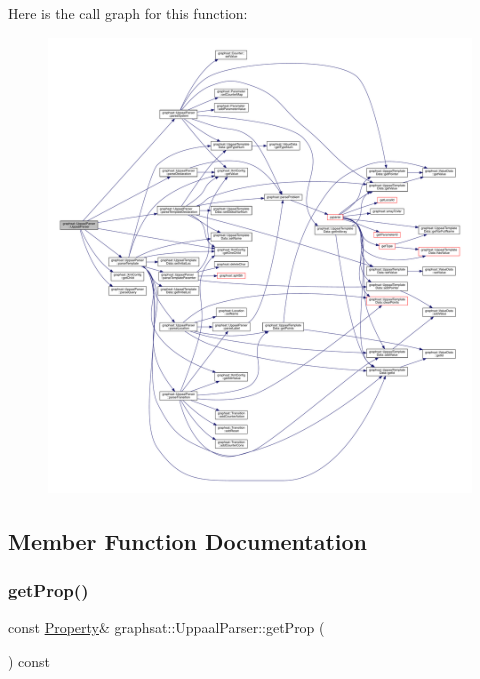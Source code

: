 Here is the call graph for this function\+:
\nopagebreak
\begin{figure}[H]
\begin{center}
\leavevmode
\includegraphics[width=350pt]{classgraphsat_1_1_uppaal_parser_a39600d3f25a764a60f8e6abd36fc024a_cgraph}
\end{center}
\end{figure}


\subsection{Member Function Documentation}
\mbox{\label{classgraphsat_1_1_uppaal_parser_a4f99de4040226d074cabfceaa0d4c109}} 
\subsubsection{\texorpdfstring{getProp()}{getProp()}}
{\footnotesize\ttfamily const \mbox{\hyperlink{classgraphsat_1_1_property}{Property}}\& graphsat\+::\+Uppaal\+Parser\+::get\+Prop (\begin{DoxyParamCaption}{ }\end{DoxyParamCaption}) const\hspace{0.3cm}{\ttfamily [inline]}}

